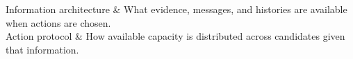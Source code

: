 Information architecture & What evidence, messages, and histories are available when actions are chosen.\\
Action protocol & How available capacity is distributed across candidates given that information.\\
